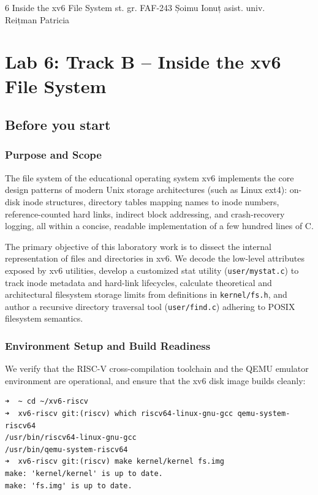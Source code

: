 \documentclass{labreport}
\begin{document}
\labtitle
    {6}
    {Inside the xv6 File System}
    {st. gr. FAF-243}
    {Șoimu Ionuț}
    {asist. univ.\\[0.15cm] Reițman Patricia}

\tableofcontents
\newpage

\section{Lab 6: Track B -- Inside the xv6 File System}

\subsection{Before you start}

\subsubsection*{Purpose and Scope}
The file system of the educational operating system xv6 implements the core design patterns of modern Unix storage architectures (such as Linux ext4): on-disk inode structures, directory tables mapping names to inode numbers, reference-counted hard links, indirect block addressing, and crash-recovery logging, all within a concise, readable implementation of a few hundred lines of C.

The primary objective of this laboratory work is to dissect the internal representation of files and directories in xv6. We decode the low-level attributes exposed by xv6 utilities, develop a customized stat utility (\texttt{user/mystat.c}) to track inode metadata and hard-link lifecycles, calculate theoretical and architectural filesystem storage limits from definitions in \texttt{kernel/fs.h}, and author a recursive directory traversal tool (\texttt{user/find.c}) adhering to POSIX filesystem semantics.

\subsubsection*{Environment Setup and Build Readiness}
We verify that the RISC-V cross-compilation toolchain and the QEMU emulator environment are operational, and ensure that the xv6 disk image builds cleanly:

\begin{lstlisting}[style=bash]
➜  ~ cd ~/xv6-riscv
➜  xv6-riscv git:(riscv) which riscv64-linux-gnu-gcc qemu-system-riscv64
/usr/bin/riscv64-linux-gnu-gcc
/usr/bin/qemu-system-riscv64
➜  xv6-riscv git:(riscv) make kernel/kernel fs.img
make: 'kernel/kernel' is up to date.
make: 'fs.img' is up to date.
\end{lstlisting}
\end{document}
